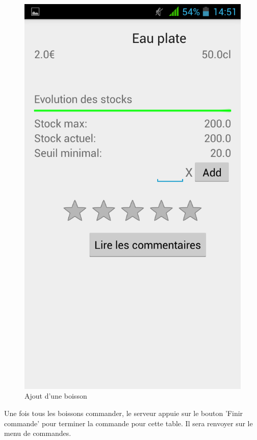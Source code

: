 \begin{figure}[H]
	\centering
	\includegraphics[scale=0.15]{img/add-drink.png}
	\caption{Ajout d'une boisson}
	\label{fig:add-drink}
\end{figure}

Une fois tous les boissons commander, le serveur appuie sur le bouton 'Finir commande' pour terminer la commande pour cette table. Il sera renvoyer sur le menu de commandes.

